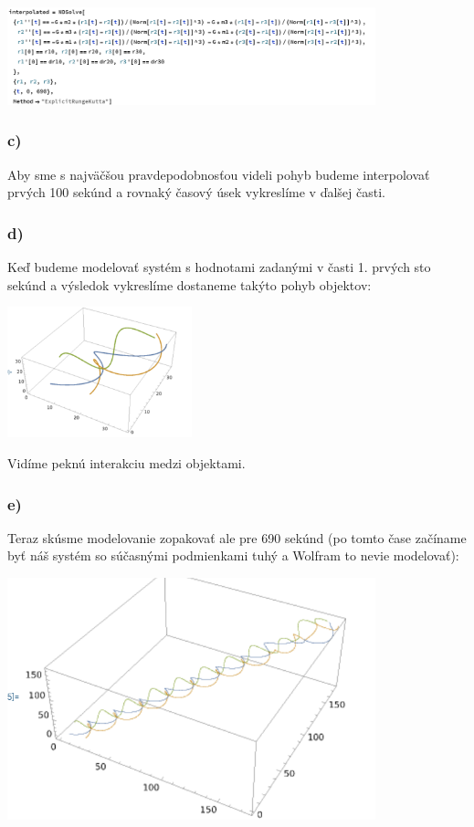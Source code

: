 \documentclass[a4paper]{article}
\begin{document}
	\centerline{\includegraphics[width=0.8\textwidth]{ndsolve}}
	
	\subsubsection{c)}
	
	Aby sme s najväčšou pravdepodobnosťou videli pohyb budeme interpolovať prvých 100 sekúnd a rovnaký časový úsek vykreslíme v ďalšej časti.
	
	\subsubsection{d)}
	
	 Keď budeme modelovať systém s hodnotami zadanými v časti 1. prvých sto sekúnd a výsledok vykreslíme dostaneme takýto pohyb objektov:
	 
	 \centerline{\includegraphics[width=0.4\textwidth]{pohyb_1}}
	 
	 Vidíme peknú interakciu medzi objektami.
	 
	 \subsubsection{e)}
	 
	 Teraz skúsme modelovanie zopakovať ale pre 690 sekúnd (po tomto čase začíname byť náš systém so súčasnými podmienkami tuhý a Wolfram to nevie modelovať):
	 
	 \centerline{\includegraphics[width=0.8\textwidth]{pohyb_2}}
	 
\end{document}
